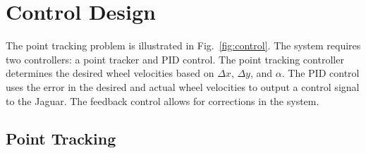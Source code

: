 \documentclass[conference]{../IEEEtran}
\begin{document}
\section{Control Design}

The point tracking problem is illustrated in Fig.~\ref{fig:control}. The system requires
two controllers: a point tracker and PID control.  The point tracking controller
determines the desired wheel velocities based on $\Delta x$, $\Delta y$, and $\alpha$.
The PID control uses the error in the desired and actual wheel velocities to output a
control signal to the Jaguar. The feedback control allows for corrections in the system.

\subsection{Point Tracking} \label{sec:ptTrack}
\end{document}
